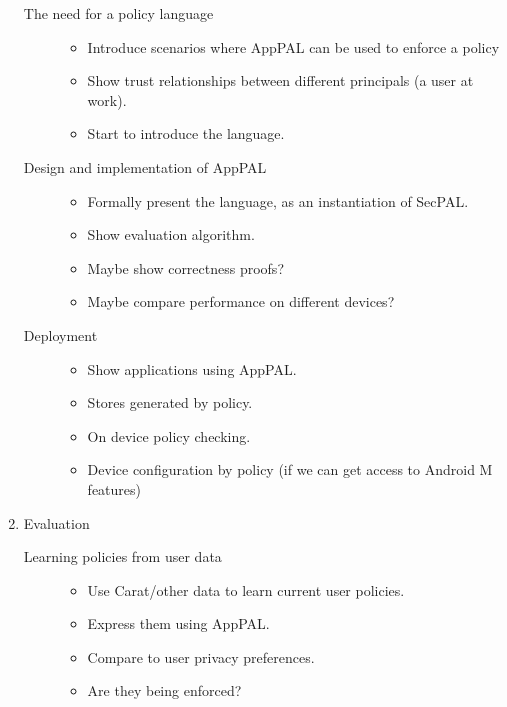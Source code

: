 \documentclass{scrartcl}
\begin{document}
\begin{enumerate}
    \begin{description}
      \item[The need for a policy language]
        \hfill
        \begin{itemize}
          \item Introduce scenarios where AppPAL can be used to enforce a policy
          \item Show trust relationships between different principals (a user at work).
          \item Start to introduce the language.
        \end{itemize}
      \item[Design and implementation of AppPAL]
        \hfill
        \begin{itemize}
          \item Formally present the language, as an instantiation of SecPAL.
          \item Show evaluation algorithm.
          \item Maybe show correctness proofs?
          \item Maybe compare performance on different devices?
        \end{itemize}
      \item[Deployment]
        \hfill
        \begin{itemize}
          \item Show applications using AppPAL.
          \item Stores generated by policy.
          \item On device policy checking.
          \item Device configuration by policy (if we can get access to Android M features)
        \end{itemize}
    \end{description}
  \item Evaluation
    \begin{description}
      \item[Learning policies from user data]
        \hfill
        \begin{itemize}
          \item Use Carat/other data to learn current user policies.
          \item Express them using AppPAL.
          \item Compare to user privacy preferences.
          \item Are they being enforced?
        \end{itemize}

\end{description}
\end{enumerate}
\end{document}
